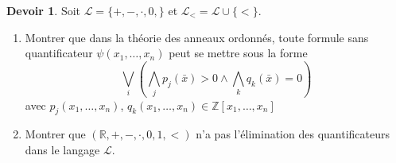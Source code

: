 \documentclass[a4paper, 12pt]{article}
\theoremstyle{definition} \newtheorem{quest}{Question}
\theoremstyle{definition} \newtheorem{dev}[quest]{Devoir}
\begin{document}
\begin{dev}
  Soit $\mathscr{L}= \{+, -, \cdot, 0, \}$ et
  $\mathscr{L}_{<} = \mathscr{L}\cup \{<\}$.
  \begin{enumerate}
  \item Montrer que dans la théorie des anneaux ordonnés, toute
    formule sans quantificateur $\psi(x_1, \ldots, x_n)$ peut
    se mettre sous la forme
    \begin{equation}
      \bigvee\limits_i \left (\bigwedge\limits_j p_j(\bar{x}) > 0 \land \bigwedge\limits_k q_k(\bar{x})=0\right)
    \end{equation}
    avec $p_j(x_1, \ldots, x_n)$,
    $q_k(x_1, \ldots, x_n)\in\mathbb Z[x_1, \ldots, x_n]$
  \item Montrer que $(\mathbb R, +, -, \cdot, 0, 1, <)$ n'a pas
    l'élimination des quantificateurs dans le langage $\mathscr L$.
  \end{enumerate}

\end{dev}

\end{document}
